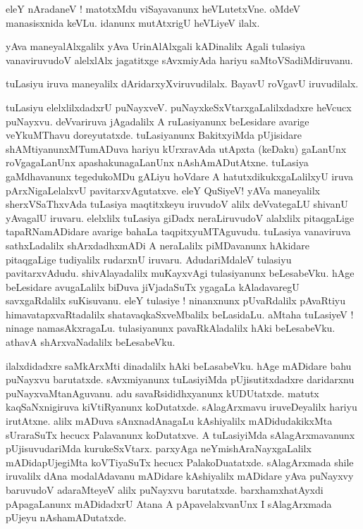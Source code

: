 \documentclass{article}
\begin{document}
\begin{mn}%
eleY nAradaneV ! matotxMdu viSayavanunx heVLutetxVne. oMdeV manasisxnida keVLu. idanunx 
mutAtxrigU heVLiyeV ilalx.
\end{mn}

\begin{mn}%
yAva maneyalAlxgalilx yAva UrinAlAlxgali kADinalilx Agali tulasiya vanaviruvudoV alelxlAlx 
jagatitxge sAvxmiyAda hariyu saMtoVSadiMdiruvanu.
\end{mn}

\begin{mn}%
tuLasiyu iruva maneyalilx dAridarxyXviruvudilalx. BayavU roVgavU iruvudilalx.
\end{mn}

\begin{mn}%
tuLasiyu elelxlilxdadxrU puNayxveV. puNayxkeSxVtarxgaLalilxdadxre heVcucx puNayxvu. 
deVvariruva jAgadalilx A ruLasiyanunx beLesidare avarige veYkuMThavu doreyutatxde. 
tuLasiyanunx BakitxyiMda pUjisidare shAMtiyanunxMTumADuva hariyu kUrxravAda utApxta (keDaku) 
gaLanUnx roVgagaLanUnx apashakunagaLanUnx nAshAmADutAtxne. tuLasiya gaMdhavanunx tegedukoMDu 
gALiyu hoVdare A hatutxdikukxgaLalilxyU iruva pArxNigaLelalxvU pavitarxvAgutatxve. eleY 
QuSiyeV! yAVa maneyalilx sherxVSaThxvAda tuLasiya maqtitxkeyu iruvudoV alilx deVvategaLU 
shivanU yAvagalU iruvaru. elelxlilx tuLasiya giDadx neraLiruvudoV alalxlilx pitaqgaLige 
tapaRNamADidare avarige bahaLa taqpitxyuMTAguvudu. tuLasiya vanaviruva sathxLadalilx 
shArxdadhxmADi A neraLalilx piMDavanunx hAkidare pitaqgaLige tudiyalilx rudarxnU iruvaru. 
AdudariMdaleV tulasiyu pavitarxvAdudu. shivAlayadalilx muKayxvAgi tulasiyanunx beLesabeVku. 
hAge beLesidare avugaLalilx biDuva jiVjadaSuTx ygagaLa kAladavaregU savxgaRdalilx 
suKisuvanu. eleY tulasiye ! ninanxnunx pUvaRdalilx pAvaRtiyu himavatapxvaRtadalilx 
shatavaqkaSxveMbalilx beLasidaLu. aMtaha tuLasiyeV ! ninage namasAkxragaLu. tulasiyanunx 
pavaRkAladalilx hAki beLesabeVku. athavA shArxvaNadalilx beLesabeVku.
\end{mn}

\begin{mn}%
ilalxdidadxre saMkArxMti dinadalilx hAki beLasabeVku. hAge mADidare bahu puNayxvu 
barutatxde. sAvxmiyanunx tuLasiyiMda pUjisutitxdadxre daridarxnu puNayxvaMtanAguvanu. adu 
savaRsididhxyanunx kUDUtatxde. matutx kaqSaNxnigiruva kiVtiRyanunx koDutatxde. sAlagArxmavu 
iruveDeyalilx hariyu irutAtxne. alilx mADuva sAnxnadAnagaLu kAshiyalilx mADidudakikxMta 
sUraraSuTx hecucx Palavanunx koDutatxve. A tuLasiyiMda sAlagArxmavanunx pUjisuvudariMda 
kurukeSxVtarx. parxyAga neYmishAraNayxgaLalilx mADidapUjegiMta koVTiyaSuTx hecucx 
PalakoDuatatxde. sAlagArxmada shile iruvalilx dAna modalAdavanu mADidare kAshiyalilx 
mADidare yAva puNayxvy baruvudoV adaraMteyeV alilx puNayxvu barutatxde. barxhamxhatAyxdi 
pApagaLanunx mADidadxrU Atana A pApavelalxvanUnx I sAlagArxmada pUjeyu nAshamADutatxde.
\end{mn}
\end{document}
